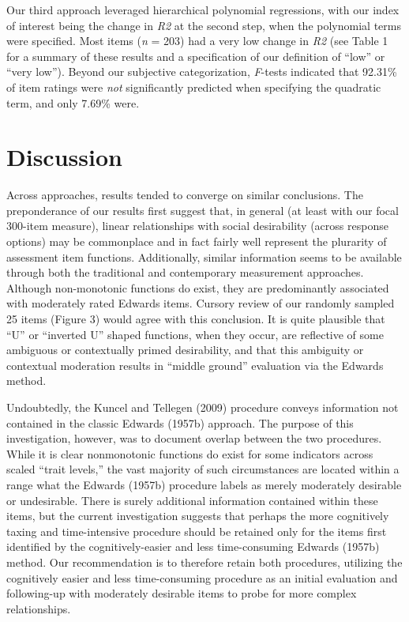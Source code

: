 \documentclass[
  ,jou]{apa6}
\begin{document}
Our third approach leveraged hierarchical polynomial regressions, with our index of interest being the change in \emph{R2} at the second step, when the polynomial terms were specified. Most items (\emph{n} = 203) had a very low change in \emph{R2} (see Table 1 for a summary of these results and a specification of our definition of ``low'' or ``very low''). Beyond our subjective categorization, \emph{F}-tests indicated that 92.31\% of item ratings were \emph{not} significantly predicted when specifying the quadratic term, and only 7.69\% were.

\hypertarget{discussion}{%
\section{Discussion}\label{discussion}}

Across approaches, results tended to converge on similar conclusions. The preponderance of our results first suggest that, in general (at least with our focal 300-item measure), linear relationships with social desirability (across response options) may be commonplace and in fact fairly well represent the plurarity of assessment item functions. Additionally, similar information seems to be available through both the traditional and contemporary measurement approaches. Although non-monotonic functions do exist, they are predominantly associated with moderately rated Edwards items. Cursory review of our randomly sampled 25 items (Figure 3) would agree with this conclusion. It is quite plausible that ``U'' or ``inverted U'' shaped functions, when they occur, are reflective of some ambiguous or contextually primed desirability, and that this ambiguity or contextual moderation results in ``middle ground'' evaluation via the Edwards method.

Undoubtedly, the Kuncel and Tellegen (2009) procedure conveys information not contained in the classic Edwards (1957b) approach. The purpose of this investigation, however, was to document overlap between the two procedures. While it is clear nonmonotonic functions do exist for some indicators across scaled ``trait levels,'' the vast majority of such circumstances are located within a range what the Edwards (1957b) procedure labels as merely moderately desirable or undesirable. There is surely additional information contained within these items, but the current investigation suggests that perhaps the more cognitively taxing and time-intensive procedure should be retained only for the items first identified by the cognitively-easier and less time-consuming Edwards (1957b) method. Our recommendation is to therefore retain both procedures, utilizing the cognitively easier and less time-consuming procedure as an initial evaluation and following-up with moderately desirable items to probe for more complex relationships.
\end{document}
